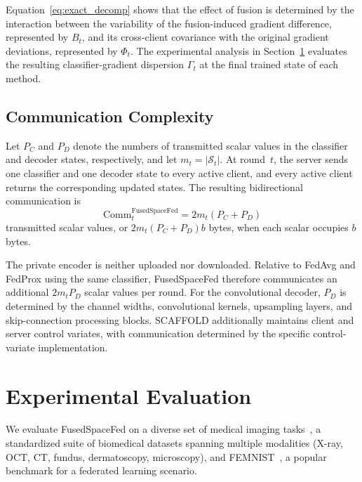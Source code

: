 \documentclass[twoside]{article}
\theoremstyle{thmstyleone}%
\theoremstyle{thmstyletwo}%
\theoremstyle{thmstylethree}%
\begin{document}
Equation~\eqref{eq:exact_decomp} shows that the effect of fusion is determined
by the interaction between the variability of the fusion-induced gradient
difference, represented by $B_t$, and its cross-client covariance with the
original gradient deviations, represented by $\Phi_t$. The experimental
analysis in Section~\ref{sec:experiments} evaluates the resulting
classifier-gradient dispersion $\Gamma_t$ at the final trained state of each
method.

\subsection{Communication Complexity}

Let $P_C$ and $P_D$ denote the numbers of transmitted scalar values in the
classifier and decoder states, respectively, and let $m_t=|\mathcal{S}_t|$.
At round~$t$, the server sends one classifier and one decoder state to every
active client, and every active client returns the corresponding updated
states. The resulting bidirectional communication is
\begin{equation*}
\mathrm{Comm}_t^{\mathrm{FusedSpaceFed}}
=
2m_t(P_C+P_D)
\end{equation*}
transmitted scalar values, or
$
2m_t(P_C+P_D)b
$
bytes, when each scalar occupies $b$ bytes.

The private encoder is neither uploaded nor downloaded. Relative to FedAvg and
FedProx using the same classifier, FusedSpaceFed therefore communicates an
additional $2m_tP_D$ scalar values per round. For the convolutional decoder,
$P_D$ is determined by the channel widths, convolutional kernels, upsampling
layers, and skip-connection processing blocks. SCAFFOLD additionally maintains
client and server control variates, with communication determined by the
specific control-variate implementation.


\section{Experimental Evaluation}\label{sec:experiments}

We evaluate FusedSpaceFed on a diverse set of medical imaging tasks~\cite{medmnistv2}, a standardized suite of biomedical datasets spanning multiple modalities (X-ray, OCT, CT, fundus, dermatoscopy, microscopy), and FEMNIST~\cite{caldas2018leaf}, a popular benchmark for a federated learning scenario.
\end{document}
